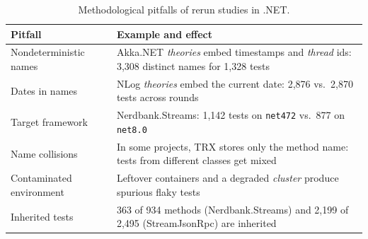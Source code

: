\begin{table}[!htbp]
\caption{Methodological pitfalls of rerun studies in .NET.}
\label{tab:armadilhas}
\centering
\footnotesize
\renewcommand{\arraystretch}{1.15}
\begin{tabular}{@{}p{}p{}@{}}
\toprule
\raggedright \textbf{Pitfall} & \raggedright \textbf{Example and effect} \tabularnewline
\midrule
\raggedright Nondeterministic names & \raggedright Akka.NET \emph{theories} embed timestamps and \emph{thread} ids: 3,308 distinct names for 1,328 tests \tabularnewline
\raggedright Dates in names & \raggedright NLog \emph{theories} embed the current date: 2,876 vs.\ 2,870 tests across rounds \tabularnewline
\raggedright Target framework & \raggedright Nerdbank.Streams: 1,142 tests on \texttt{net472} vs.\ 877 on \texttt{net8.0} \tabularnewline
\raggedright Name collisions & \raggedright In some projects, TRX stores only the method name: tests from different classes get mixed \tabularnewline
\raggedright Contaminated environment & \raggedright Leftover containers and a degraded \emph{cluster} produce spurious flaky tests \tabularnewline
\raggedright Inherited tests & \raggedright 363 of 934 methods (Nerdbank.Streams) and 2,199 of 2,495 (StreamJsonRpc) are inherited \tabularnewline
\bottomrule
\end{tabular}
\end{table}

